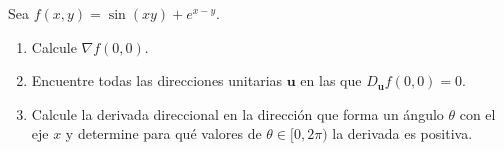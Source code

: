 Sea $f(x, y) = \sin(xy) + e^{x - y}$.
\begin{enumerate}
    \item Calcule $\nabla f(0, 0)$.
    \item Encuentre todas las direcciones unitarias $\mathbf{u}$ en las que $D_{\mathbf{u}} f(0, 0) = 0$.
    \item Calcule la derivada direccional en la dirección que forma un ángulo $\theta$ con el eje $x$ y determine para qué valores de $\theta \in [0, 2\pi)$ la derivada es positiva.
\end{enumerate}
